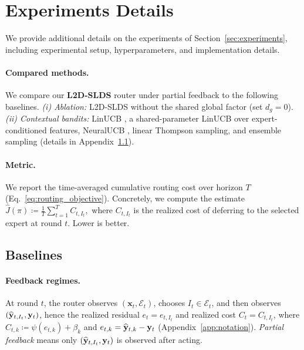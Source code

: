\section{Experiments Details}
\label{sec:experiments-details}

We provide additional details on the experiments of Section~\ref{sec:experiments}, including
experimental setup, hyperparameters, and implementation details.

\paragraph{Compared methods.}
We compare our \textbf{L2D-SLDS} router under partial feedback to the following baselines.
\emph{(i) Ablation:} L2D-SLDS without the shared global factor (set \(d_g=0\)).
\emph{(ii) Contextual bandits:} LinUCB \citep{li2010contextual}, a shared-parameter LinUCB over
expert-conditioned features, NeuralUCB \citep{zhou2020neuralcontextualbanditsucbbased}, linear
Thompson sampling, and ensemble sampling \citep{lu2017ensemble} (details in
Appendix~\ref{subsection:baselines}).

\paragraph{Metric.}
We report the time-averaged cumulative routing cost over horizon \(T\) (Eq.~\eqref{eq:routing_objective}). Concretely, we
compute the estimate
\(
\hat{J}(\pi) \coloneqq \frac{1}{T}\sum_{t=1}^T C_{t,I_t},
\)
where \(C_{t,I_t}\) is the realized cost of deferring to the selected expert at round \(t\). Lower is better.

\subsection{Baselines} \label{subsection:baselines}

\paragraph{Feedback regimes.}
At round \(t\), the router observes \((\mathbf{x}_t,\mathcal{E}_t)\), chooses \(I_t\in\mathcal{E}_t\),
and then observes \((\widehat{\mathbf{y}}_{t,I_t},\mathbf{y}_t)\), hence the realized residual \(e_t=e_{t,I_t}\) and realized
cost \(C_t=C_{t,I_t}\), where \(C_{t,k}\coloneqq \psi(e_{t,k})+\beta_k\) and
\(e_{t,k}=\widehat{\mathbf{y}}_{t,k}-\mathbf{y}_t\) (Appendix~\ref{app:notation}).
\emph{Partial feedback} means only \((\widehat{\mathbf{y}}_{t,I_t},\mathbf{y}_t)\) is observed after acting.

